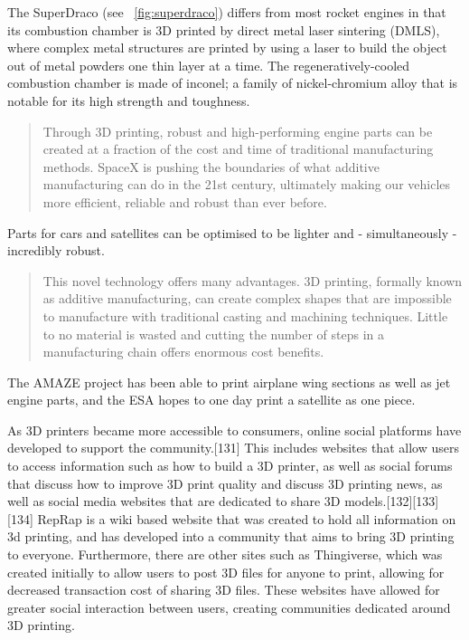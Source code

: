 The SuperDraco (see \figurename~\ref{fig:superdraco}) differs from most rocket engines in that its combustion chamber is 3D printed by direct metal laser sintering (DMLS), where complex metal structures are printed by using a laser to build the object out of metal powders one thin layer at a time. The regeneratively-cooled combustion chamber is made of inconel; a family of nickel-chromium alloy that is notable for its high strength and toughness.

\begin{quotation}
    Through 3D printing, robust and high-performing engine parts can be created at a fraction of the cost and time of traditional manufacturing methods. SpaceX is pushing the boundaries of what additive manufacturing can do in the 21st century, ultimately making our vehicles more efficient, reliable and robust than ever before.
\end{quotation}


Parts for cars and satellites can be optimised to be lighter and - simultaneously - incredibly robust.

\begin{quotation}
    This novel technology offers many advantages. 3D printing, formally known as additive manufacturing, can create complex shapes that are impossible to manufacture with traditional casting and machining techniques. Little to no material is wasted and cutting the number of steps in a manufacturing chain offers enormous cost benefits.
\end{quotation}

The AMAZE project has been able to print airplane wing sections as well as jet engine parts, and the ESA hopes to one day print a satellite as one piece.



As 3D printers became more accessible to consumers, online social platforms have developed to support the community.[131] This includes websites that allow users to access information such as how to build a 3D printer, as well as social forums that discuss how to improve 3D print quality and discuss 3D printing news, as well as social media websites that are dedicated to share 3D models.[132][133][134] RepRap is a wiki based website that was created to hold all information on 3d printing, and has developed into a community that aims to bring 3D printing to everyone. Furthermore, there are other sites such as Thingiverse, which was created initially to allow users to post 3D files for anyone to print, allowing for decreased transaction cost of sharing 3D files. These websites have allowed for greater social interaction between users, creating communities dedicated around 3D printing.

